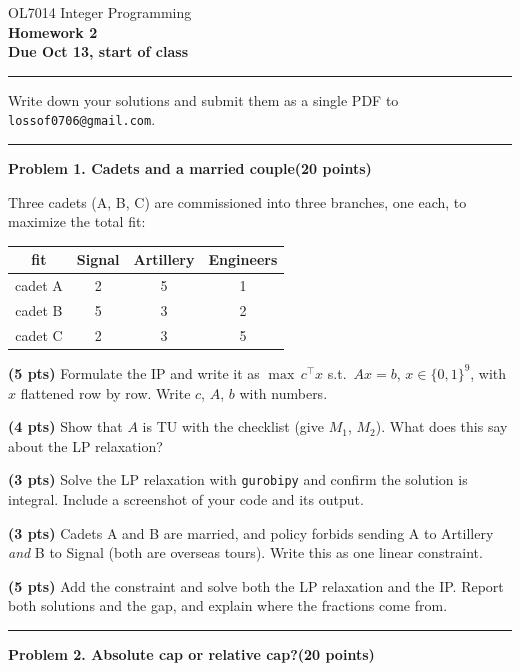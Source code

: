 \documentclass[10pt]{article}
\newcommand{\problem}[2]{%
  \par\bigskip
  {\color{ruleink}\rule{\textwidth}{1pt}}\par\nobreak\vspace{3pt}
  {\large\bfseries #2}\hfill{\normalsize\bfseries(#1 points)}\par\nobreak\vspace{4pt}}
\begin{document}
\begin{center}
  {\large OL7014 Integer Programming}\\[3pt]
  {\Large\bfseries Homework 2}\\[4pt]
  {\small \textbf{Due Oct 13, start of class}}
\end{center}
\medskip\hrule\medskip

Write down your solutions and submit them as a single PDF to
\texttt{lossof0706@gmail.com}.

\problem{20}{Problem 1. Cadets and a married couple}

Three cadets (A, B, C) are commissioned into three branches, one each, to maximize the
total fit:
\begin{center}
\begin{tabular}{c|ccc}
 fit & Signal & Artillery & Engineers \\ \hline
 cadet A & 2 & 5 & 1 \\
 cadet B & 5 & 3 & 2 \\
 cadet C & 2 & 3 & 5 \\
\end{tabular}
\end{center}

\begin{parts}
\item \textbf{(5 pts)} Formulate the IP and write it as $\max\, c^{\top}x$ s.t.\
  $Ax = b$, $x \in \{0,1\}^9$, with $x$ flattened row by row. Write $c$, $A$, $b$ with
  numbers.
\item \textbf{(4 pts)} Show that $A$ is TU with the checklist (give $M_1$, $M_2$). What
  does this say about the LP relaxation?
\item \textbf{(3 pts)} Solve the LP relaxation with \texttt{gurobipy} and confirm the
  solution is integral. Include a screenshot of your code and its output.
\item \textbf{(3 pts)} Cadets A and B are married, and policy forbids sending A to
  Artillery \emph{and} B to Signal (both are overseas tours). Write this as one linear
  constraint.
\item \textbf{(5 pts)} Add the constraint and solve both the LP relaxation and the IP.
  Report both solutions and the gap, and explain where the fractions come from.
\end{parts}

\problem{20}{Problem 2. Absolute cap or relative cap?}
\end{document}
